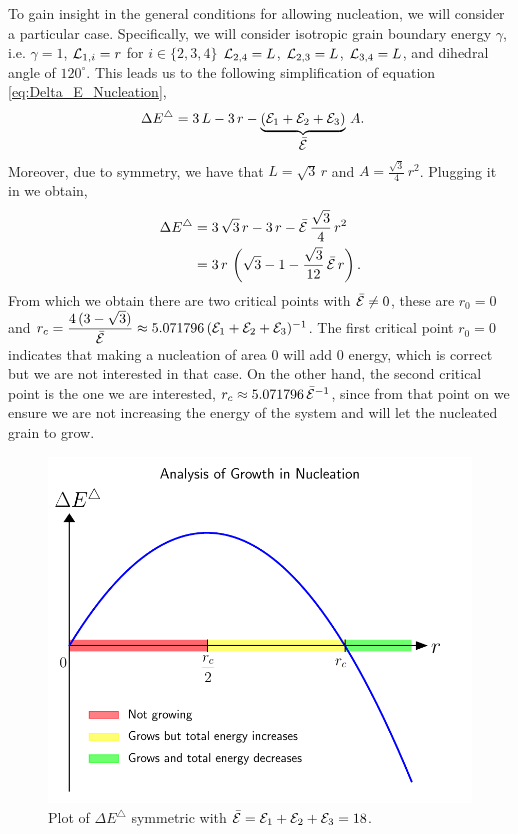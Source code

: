 To gain insight in the general conditions for allowing nucleation, we will consider a particular case.
Specifically, we will consider isotropic grain boundary energy $\gamma$, i.e. $\gamma=1$,
$\mathcal{L}_{1,i}=r$ for $i\in\{2,3,4\}$
$\mathcal{L}_{2,4}=L$, $\mathcal{L}_{2,3}=L$, $\mathcal{L}_{3,4}=L$, and dihedral angle of $120^\circ$.
This leads us to the following simplification
of equation \eqref{eq:Delta_E_Nucleation},
\begin{align*}
    \Delta E^{\triangle} &=
    3\,L-3\,r-
    \underbrace{(\mathcal{E}_1+\mathcal{E}_2+\mathcal{E}_3)}_{\displaystyle{\bar{\mathcal{E}}}}\,A.
\end{align*}
Moreover, due to symmetry, we have that $L=\sqrt{3}\,r$ and $A=\frac{\sqrt{3}}{4}\,r^2$. 
Plugging it in we obtain,
\begin{align*}
    \Delta E^{\triangle} &=
    3\,\sqrt{3}\,r-3\,r-
    \bar{\mathcal{E}}\,\frac{\sqrt{3}}{4}\,r^2\\
    &=3\,r\,\left(\sqrt{3}-1-\frac{\sqrt{3}}{12}\,\bar{\mathcal{E}}\,r\right).
\end{align*}
From which we obtain there are two critical points
with $\bar{\mathcal{E}}\neq 0$, these are $r_0=0$ and 
$r_c=\dfrac{4\,(3 - \sqrt{3})}{\bar{\mathcal{E}}}\approx5.071796\,(\mathcal{E}_1+\mathcal{E}_2+\mathcal{E}_3)^{-1}$.
The first critical point $r_0=0$ indicates that making
a nucleation of area $0$ will add $0$ energy, which
is correct but we are not interested in that case.
On the other hand, the second critical point
is the one we are interested, 
$r_c \approx 5.071796 \,\bar{\mathcal{E}}^{-1}$,
since from that point on we ensure we are
not increasing the energy of the system and will
let the nucleated grain to grow.
%
\begin{figure}
    \centering
    \includegraphics[scale=0.6]{figures/DeltaETriangle.pdf}
    \caption{Plot of $\Delta E^{\triangle}$ symmetric with $\bar{\mathcal{E}}=\mathcal{E}_1+\mathcal{E}_2+\mathcal{E}_3=18$.}
    \label{fig:DeltaSE_E6}
\end{figure}

